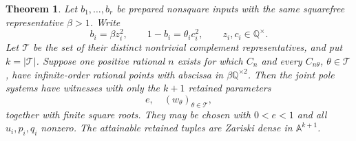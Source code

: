 \documentclass[11pt,a4paper]{article}
\newtheorem{theorem}{Theorem}[section]\newtheorem{lemma}[theorem]{Lemma}
\theoremstyle{definition}\newtheorem{definition}[theorem]{Definition}
\theoremstyle{remark}\newtheorem{remark}[theorem]{Remark}
\newcommand{\Q}{\mathbb Q}\newcommand{\Z}{\mathbb Z}
\begin{document}
\begin{theorem}\label{thm:common}
Let $b_1,\ldots,b_r$ be prepared nonsquare inputs with the same
squarefree representative $\beta>1$. Write
\[
 b_i=\beta z_i^2,\qquad 1-b_i=\theta_i c_i^2,
 \qquad z_i,c_i\in\Q^\times.
\]
Let $\mathcal T$ be the set of their distinct nontrivial complement
representatives, and put $k=|\mathcal T|$.
Suppose one positive rational $n$ exists for which $C_n$ and every
$C_{n\theta}$, $\theta\in\mathcal T$, have infinite-order rational
points with abscissa in $\beta\Q^{\times2}$.
Then the joint pole systems have witnesses with only the $k+1$ retained
parameters
\[
                              e,\quad (w_\theta)_{\theta\in\mathcal T},
\]
together with finite square roots. They may be chosen with
$0<e<1$ and all $u_i,p_i,q_i$ nonzero. The attainable retained tuples
are Zariski dense in $\mathbb A^{k+1}$.
\end{theorem}
\end{document}
